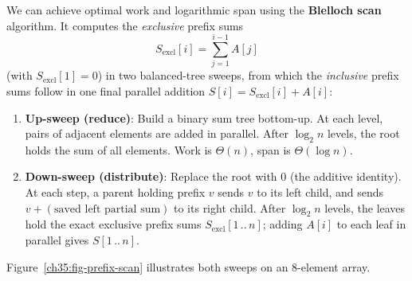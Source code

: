 We can achieve optimal work and logarithmic span using the \textbf{Blelloch scan}
algorithm. It computes the \emph{exclusive} prefix sums
\[
S_{\text{excl}}[i] = \sum_{j=1}^{i-1} A[j]
\] (with $S_{\text{excl}}[1] = 0$) in
two balanced-tree sweeps, from which the \emph{inclusive} prefix sums follow in
one final parallel addition $S[i] = S_{\text{excl}}[i] + A[i]$:
\begin{enumerate}
  \item \textbf{Up-sweep (reduce)}: Build a binary sum tree bottom-up. At each
        level, pairs of adjacent elements are added in parallel. After $\log_2 n$
        levels, the root holds the sum of all elements. Work is $\Theta(n)$,
        span is $\Theta(\log n)$.
  \item \textbf{Down-sweep (distribute)}: Replace the root with $0$ (the additive
        identity). At each step, a parent holding prefix $v$ sends $v$ to its
        left child, and sends $v + (\text{saved left partial sum})$ to its right child.
        After $\log_2 n$ levels, the leaves hold the exact exclusive prefix sums
        $S_{\text{excl}}[1\,..\,n]$; adding $A[i]$ to each leaf in parallel gives $S[1\,..\,n]$.
\end{enumerate}

Figure~\ref{ch35:fig-prefix-scan} illustrates both sweeps on an $8$-element array.

